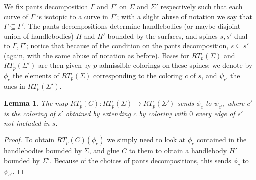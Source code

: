 \documentclass[12pt]{amsart}
\newtheorem{lem}[thm]{Lemma}
\theoremstyle{definition}
\newcommand{\ra}{\rightarrow}
\begin{document}
We fix pants decomposition $\Gamma$ and $\Gamma'$ on $\Sigma$ and $\Sigma'$ respectively such that each curve of $\Gamma$ is isotopic to a curve in $\Gamma'$; with a slight abuse of notation we say that $\Gamma\subseteq \Gamma'$. The pants decompositions determine handlebodies (or maybe disjoint union of handlebodies) $H$ and $H'$ bounded by the surfaces, and spines $s,s'$ dual to $\Gamma,\Gamma'$; notice that because of the condition on the pants decomposition, $s\subseteq s'$ (again, with the same abuse of notation as before). Bases for $RT_p(\Sigma)$ and $RT_p(\Sigma')$ are then given by $p$-admissible colorings on these spines; we denote by $\phi_c$ the elements of $RT_p(\Sigma)$ corresponding to the coloring $c$ of $s$, and $\psi_{c'}$ the ones in $RT_p(\Sigma')$.
\begin{lem}
	The map $RT_p(C):RT_p(\Sigma)\ra RT_p(\Sigma')$ sends $\phi_c$ to $\psi_{c'}$, where $c'$ is the coloring of $s'$ obtained by extending $c$ by coloring with $0$ every edge of $s'$ not included in $s$.
\end{lem}
\begin{proof}
	To obtain $RT_p(C)(\phi_c)$ we simply need to look at $\phi_c$ contained in the handlebodies bounded by $\Sigma$, and glue $C$ to them to obtain a handlebody $H'$ bounded by $\Sigma'$. Because of the choices of pants decompositions, this sends $\phi_c$ to $\psi_{c'}$.
\end{proof}
\end{document}
